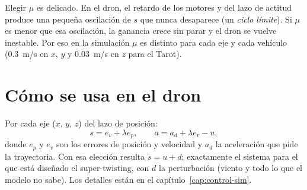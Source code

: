 \begin{aviso}
Elegir $\mu$ es delicado. En el dron, el retardo de los motores y del lazo de actitud produce una
pequeña oscilación de $s$ que nunca desaparece (un \emph{ciclo límite}). Si $\mu$ es menor que esa
oscilación, la ganancia crece sin parar y el dron se vuelve inestable. Por eso en la simulación $\mu$
es distinto para cada eje y cada vehículo (0.3~m/s en $x$, $y$ y 0.03~m/s en $z$ para el Tarot).
\end{aviso}

\section{Cómo se usa en el dron}

Por cada eje ($x$, $y$, $z$) del lazo de posición:
\begin{equation}
s = e_v + \lambda e_p ,\qquad a = a_d + \lambda e_v - u ,
\end{equation}
donde $e_p$ y $e_v$ son los errores de posición y velocidad y $a_d$ la aceleración que pide la
trayectoria. Con esa elección resulta $\dot s = u + d$: exactamente el sistema para el que está
diseñado el super-twisting, con $d$ la perturbación (viento y todo lo que el modelo no sabe). Los
detalles están en el capítulo~\ref{cap:control-sim}.

